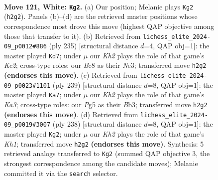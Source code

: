 \documentclass[11pt]{article}
\begin{document}
\clearpage

\begin{figure}[p]\centering
\begin{subfigure}{0.46\textwidth}\centering
\resizebox{\linewidth}{!}{%
\newchessgame
\chessboard[
  setfen={2B5/6k1/8/6PP/8/8/n6K/8 w - - 11 121},
  showmover=false,
  pgfstyle=straightmove, color=movearrow, markmove={h2-g2}
]}
\caption{}
\end{subfigure}\hfill
\begin{subfigure}{0.46\textwidth}\centering
\resizebox{\linewidth}{!}{%
\newchessgame
\chessboard[
  setfen={8/2k1N3/8/2p5/p7/2K1n3/8/8 b - - 13 118},
  showmover=false,
  pgfstyle=straightmove, color=movearrow, markmove={c7-d7}
]}
\caption{}
\end{subfigure}
\\[4pt]
\begin{subfigure}{0.46\textwidth}\centering
\resizebox{\linewidth}{!}{%
\newchessgame
\chessboard[
  setfen={8/8/k7/8/8/pb6/8/1K6 b - - 89 120},
  showmover=false,
  pgfstyle=straightmove, color=movearrow, markmove={a6-a7}
]}
\caption{}
\end{subfigure}\hfill
\begin{subfigure}{0.46\textwidth}\centering
\resizebox{\linewidth}{!}{%
\newchessgame
\chessboard[
  setfen={8/5k2/8/5P2/4n3/8/8/7K w - - 81 120},
  showmover=false,
  pgfstyle=straightmove, color=movearrow, markmove={h1-g2}
]}
\caption{}
\end{subfigure}
\caption{\textbf{Move 121, White: \texttt{Kg2}.} (a) Our position; Melanie plays \texttt{Kg2} (\texttt{h2g2}). Panels (b)--(d) are the retrieved master positions whose correspondence most drove this move (highest QAP objective among those that transfer to it). (b) Retrieved from \texttt{lichess\_elite\_2024-09\_p0012\#886} (ply 235) [structural distance $d$=4, QAP obj=1]: the master played \texttt{Kd7}; under $\mu$ our \emph{Kh2} plays the role of that game's \emph{Kc2}; cross-type roles: our \emph{B}c8 as their \emph{N}e3; transferred move \texttt{h2g2} \textbf{(endorses this move)}. (c) Retrieved from \texttt{lichess\_elite\_2024-09\_p0023\#1101} (ply 239) [structural distance $d$=8, QAP obj=1]: the master played \texttt{Ka7}; under $\mu$ our \emph{Kh2} plays the role of that game's \emph{Ka3}; cross-type roles: our \emph{P}g5 as their \emph{B}b3; transferred move \texttt{h2g2} \textbf{(endorses this move)}. (d) Retrieved from \texttt{lichess\_elite\_2024-09\_p0019\#3007} (ply 238) [structural distance $d$=8, QAP obj=1]: the master played \texttt{Kg2}; under $\mu$ our \emph{Kh2} plays the role of that game's \emph{Kh1}; transferred move \texttt{h2g2} \textbf{(endorses this move)}. Synthesis: 5 retrieved analogs transferred to \texttt{Kg2} (summed QAP objective 3, the strongest correspondence among the candidate moves); Melanie committed it via the \texttt{search} selector.}
\label{fig:thought-m240}
\end{figure}
\end{document}
